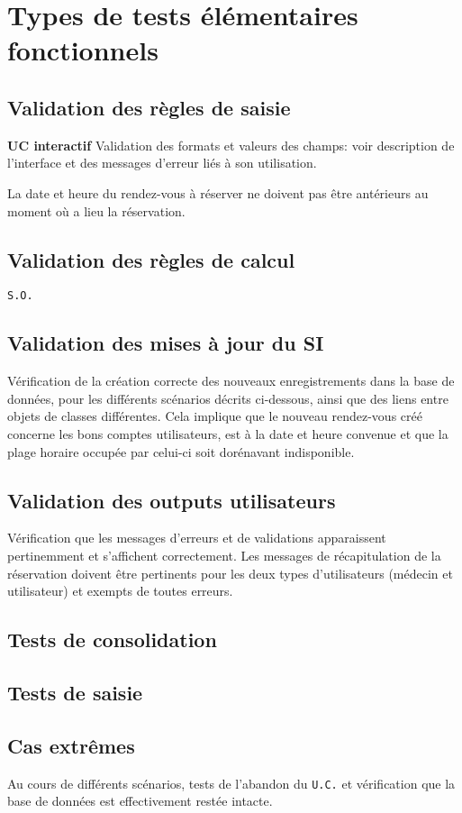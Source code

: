 \documentclass[a4paper, 11pt]{report}
\begin{document}
	\section{Types de tests élémentaires fonctionnels}
	\subsection{Validation des règles de saisie}
	\textbf{UC interactif}
	Validation des formats et valeurs des champs: voir description de l’interface et
	des messages d’erreur liés à son utilisation.

	La date et heure du rendez-vous à réserver ne doivent pas être antérieurs au
	moment où a lieu la réservation. 
	\subsection{Validation des règles de calcul}
	\texttt{S.O.}
	\subsection{Validation des mises à jour du SI}
	Vérification de la création correcte des nouveaux enregistrements dans la base
	de données, pour les différents scénarios décrits ci-dessous, ainsi que des
	liens entre objets de classes différentes. 
	Cela implique que le nouveau rendez-vous créé concerne les bons comptes
	utilisateurs, est à la date et heure convenue et que la plage horaire occupée
	par celui-ci soit dorénavant indisponible.
	\subsection{Validation des outputs utilisateurs}
	Vérification que les messages d’erreurs et de validations apparaissent
	pertinemment et s’affichent correctement. Les messages de récapitulation de la
	réservation doivent être pertinents pour les deux types d’utilisateurs (médecin
	et utilisateur) et exempts de toutes erreurs.
	\subsection{Tests de consolidation}

	\subsection{Tests de saisie}
	\subsection{Cas extrêmes}
	Au cours de différents scénarios, tests de l'abandon du \texttt{U.C.} et vérification que
	la base de données est effectivement restée intacte.
\end{document}
